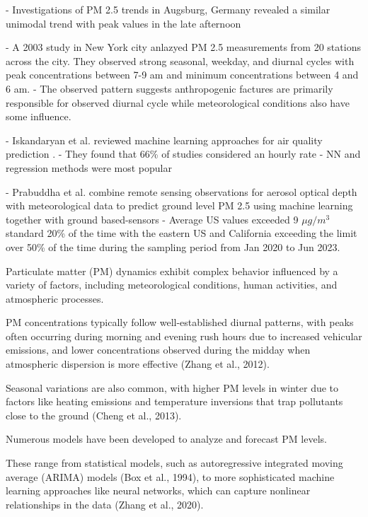 - Investigations of PM 2.5 trends in Augsburg, Germany revealed a similar
unimodal trend with peak values in the late afternoon \cite{pm-patterns-germany}

- A 2003 study in New York city anlazyed PM 2.5 measurements from 20 stations
across the city. They observed strong seasonal, weekday, and diurnal cycles with
peak concentrations between 7-9 am and minimum concentrations between 4 and 6
am. \cite{pm-patterns-nyc}
- The observed pattern suggests anthropogenic factures are primarily responsible
for observed diurnal cycle while meteorological conditions also have some influence.

- Iskandaryan et al. reviewed machine learning approaches for air quality
prediction \cite{skandaryan-2020}.
- They found that 66\% of studies considered an hourly rate
- NN and regression methods were most popular

- Prabuddha et al. combine remote sensing observations for aerosol optical depth
with meteorological data to predict ground level PM 2.5 using machine learning
together with ground based-sensors \cite{prabuddha-pm-satellite}
- Average US values exceeded 9 $\mu g/m^3$ standard 20\% of the time with the
eastern US and California exceeding the limit over 50\% of the time during the
sampling period from Jan 2020 to Jun 2023.





Particulate matter (PM) dynamics exhibit complex behavior influenced by a
variety of factors, including meteorological conditions, human activities, and
atmospheric processes.

PM concentrations typically follow well-established
diurnal patterns, with peaks often occurring during morning and evening rush
hours due to increased vehicular emissions, and lower concentrations observed
during the midday when atmospheric dispersion is more effective (Zhang et al.,
2012).

Seasonal variations are also common, with higher PM levels in winter due to
factors like heating emissions and temperature inversions that trap pollutants
close to the ground (Cheng et al., 2013).

Numerous models have been developed to analyze and forecast PM levels.

These range from statistical models, such as autoregressive integrated moving
average (ARIMA) models (Box et al., 1994), to more sophisticated machine
learning approaches like neural networks, which can capture nonlinear
relationships in the data (Zhang et al., 2020).

